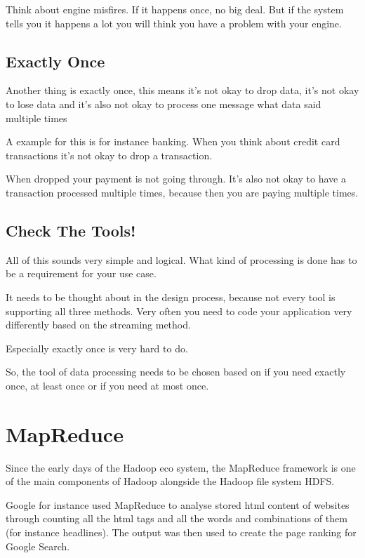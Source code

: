 \documentclass[12pt, numbers=noenddot]{scrreprt} %
\begin{document}
Think about engine misfires. If it happens once, no big deal. But if the system tells you it happens a lot you will think you have a problem with your engine.

\subsection{Exactly Once}

Another thing is exactly once, this means it’s not okay to drop data, it’s not okay to lose data and it’s also not okay to process one message what data said multiple times

A example for this is for instance banking. When you think about credit card transactions it’s not okay to drop a transaction.

When dropped your payment is not going through. It’s also not okay to have a transaction processed multiple times, because then you are paying multiple times.

\subsection{Check The Tools!}

All of this sounds very simple and logical. What kind of processing is done has to be a requirement for your use case.

It needs to be thought about in the design process, because not every tool is supporting all three methods. Very often you need to code your application very differently based on the streaming method.

Especially exactly once is very hard to do.

So, the tool of data processing needs to be chosen based on if you need exactly once, at least once or if you need at most once.



\section{MapReduce}

Since the early days of the Hadoop eco system, the MapReduce framework is one of the main components of Hadoop alongside the Hadoop file system HDFS.

Google for instance used MapReduce to analyse stored html content of websites through counting all the html tags and all the words and combinations of them (for instance headlines). The output was then used to create the page ranking for Google Search.
\end{document}
